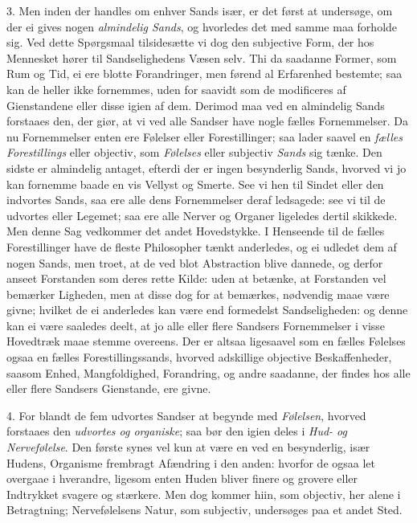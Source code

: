 \documentclass[12pt,a4paper]{article}
\newcommand{\opage}[1]{\marginnote{\footnotesize\textit{[#1]}}}
\begin{document}
3. Men inden der handles om enhver Sands især, er det først at undersøge, om der ei
gives nogen \emph{almindelig Sands}, og hvorledes det med samme
\opage{62} maa forholde sig. Ved dette Spørgsmaal tilsidesætte vi dog den subjective Form, der
hos Mennesket hører til Sandselighedens Væsen selv. Thi da saadanne Former, som Rum og
Tid, ei ere blotte Forandringer, men førend al Erfarenhed bestemte; saa kan de heller
ikke fornemmes, uden for saavidt som de modificeres af Gienstandene eller disse igien
af dem. Derimod maa ved en almindelig Sands forstaaes den, der giør, at vi ved alle
Sandser have nogle fælles Fornemmelser. Da nu Fornemmelser enten ere Følelser eller
Forestillinger; saa lader saavel en \emph{fælles Forestillings} eller objectiv, som
\emph{Følelses} eller subjectiv \emph{Sands} sig tænke. Den sidste er almindelig
antaget, efterdi der er ingen besynderlig Sands, hvorved vi jo kan fornemme baade en
vis Vellyst og Smerte. See vi hen til Sindet eller den indvortes Sands, saa ere alle
dens Fornemmelser deraf ledsagede: see vi til de udvortes eller Legemet; saa ere alle
Nerver og Organer ligeledes dertil skikkede. Men denne Sag vedkommer det andet
Hovedstykke. I Henseende til de fælles Forestillinger have de fleste Philosopher tænkt
anderledes, og ei udledet dem af nogen Sands, men troet, at de ved blot Abstraction
blive dannede, og derfor anseet Forstanden som deres rette Kilde: uden at betænke, at
Forstanden vel bemærker Ligheden, men at disse dog for at bemærkes, nødvendig maae
være givne; hvilket de ei anderledes kan være end formedelst Sandseligheden: og denne
kan
\opage{63} ei være saaledes deelt, at jo alle eller flere Sandsers Fornemmelser i visse Hovedtræk
maae stemme overeens. Der er altsaa ligesaavel som en fælles Følelses ogsaa en fælles
Forestillingssands, hvorved adskillige objective Beskaffenheder, saasom Enhed,
Mangfoldighed, Forandring, og andre saadanne, der findes hos alle eller flere Sandsers
Gienstande, ere givne.

4. For blandt de fem udvortes Sandser at begynde med \emph{Følelsen}, hvorved forstaaes
den \emph{udvortes og organiske}; saa bør den igien deles i \emph{Hud- og
Nervefølelse}. Den første synes vel kun at være en ved en besynderlig, især Hudens,
Organisme frembragt Afændring i den anden: hvorfor de ogsaa let overgaae i hverandre,
ligesom enten Huden bliver finere og grovere eller Indtrykket svagere og stærkere. Men
dog kommer hiin, som objectiv, her alene i Betragtning; Nervefølelsens Natur, som
subjectiv, undersøges paa et andet Sted.
\end{document}
